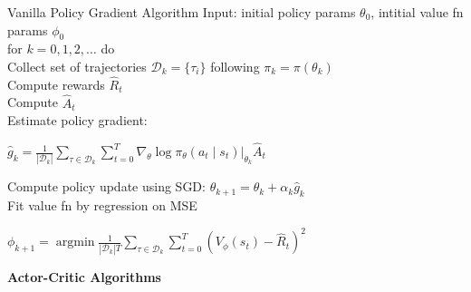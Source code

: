 \documentclass[twocolumn]{article}
\DeclareMathOperator*{\argmin}{argmin}
\begin{document}


\begin{mydef}{Vanilla Policy Gradient Algorithm}{}
    Input: initial policy params $\theta_0$, intitial value fn params $\phi_0$ \\
    for $k=0,1,2,\dots$ do \\
        \hspace*{2em}Collect set of trajectories $\mathcal D_k = \{\tau_i\}$ following $\pi_k = \pi(\theta_k)$ \\
        \hspace*{2em}Compute rewards $\hat R_t$ \\
        \hspace*{2em}Compute $\hat A_t$ \\
        \hspace*{2em}Estimate policy gradient:
        
        \centering $\hat g_k = \frac{1}{|\mathcal D_k|} \sum_{\tau \in \mathcal D_k}\sum_{t=0}^T \nabla_\theta \log \pi_\theta(a_t \mid s_t) \vert_{\theta_k} \hat A_t$ \flushleft

        \hspace*{2em}Compute policy update using SGD: $\theta_{k+1} = \theta_k + \alpha_k \hat g_k$ \\
        \hspace*{2em}Fit value fn by regression on MSE

        \centering $\phi_{k+1} = \argmin \frac{1}{|\mathcal D_k| T} \sum_{\tau \in \mathcal D_k} \sum_{t=0}^T \left(V_\phi(s_t) - \hat R_t \right)^2$
\end{mydef}


\newpage

\textbf{Actor-Critic Algorithms}
\end{document}
